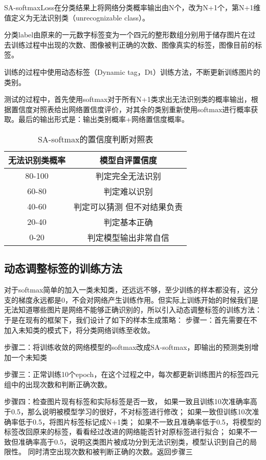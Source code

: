 SA-softmaxLoss在分类结果上将网络分类概率输出由N个，改为N+1个，第N+1维值定义为无法识别类（unrecognizable class）。

分类label由原来的一元数字标签变为一个四元的整形数组分别用于储存图片在过去训练过程中出现的次数、图像被判正确的次数、图像真实的标签，图像目前的标签。

训练的过程中使用动态标签（Dynamic tag，Dt）训练方法，不断更新训练图片的类别。

测试的过程中，首先使用softmax对于所有N+1类求出无法识别类的概率输出，根据置信度对照表给出网络置信度评价，对其余的类别重新使用softmax进行概率获取。最后的输出形式是：输出类别概率+网络置信度概率。

 \begin{table}
  \centering
   \caption{SA-softmax的置信度判断对照表}
   \label{tab:req-pkg}
   \begin{tabular}{c|c}
     \toprule
     无法识别类概率 & 模型自评置信度 \\
     \midrule
     80-100 & 判定完全无法识别				 	\\
     60-80  & 判定难以识别 				 		\\
     40-60  & 判定可以猜测 但不对结果负责  	 	\\
     20-40  & 判定基本正确    					\\
     0-20   & 判定模型输出非常自信				\\
     \bottomrule
   \end{tabular}
 \end{table}

\subsection{动态调整标签的训练方法}
对于softmax简单的加入一类未知类，还远远不够，至少训练的样本都没有，这分支的梯度永远都是0，不会对网络产生训练作用。但实际上训练开始的时候我们是无法知道哪些图片是网络不能够正确识别的，所以引入动态调整标签的训练方法：
于是在现有的框架下，我们设计了如下的样本生成策略：
步骤一：首先需要在不加入未知类的模式下，将分类网络训练至收敛。

步骤二：将训练收敛的网络模型的softmax改成SA-softmax，即输出的预测类别增加一个未知类

步骤三：正常训练10个epoch，在这个过程之中，每次都更新训练图片的标签四元组中的出现次数和判断正确次数。

步骤四：检查图片现有标签和实际标签是否一致，
如果一致且训练10次准确率高于0.5，那么说明被模型学习的很好，不对标签进行修改；
如果一致但训练10次准确率低于0.5，将图片标签标记成N+1类；
如果不一致且准确率低于0.5，将模型的标签改回原来的标签，看看经过改进的网络能否针对原标签进行拟合；
如果不一致但准确率高于0.5，说明这类图片被成功分到无法识别类，模型认识到自己的局限性。
同时清空出现次数和被判断正确的次数。返回步骤三

